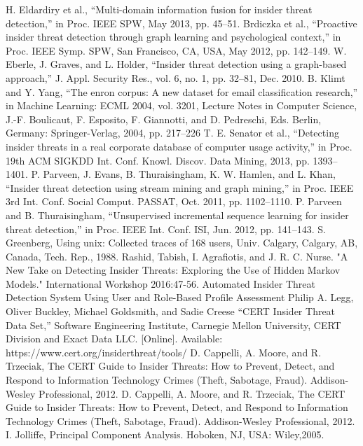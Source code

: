 \documentclass[conference]{IEEEtran}
\begin{document}
\begin{thebibliography}{00}
 H. Eldardiry et al., “Multi-domain information fusion for insider threat detection,” in Proc. IEEE SPW, May 2013, pp. 45–51.
 Brdiczka et al., “Proactive insider threat detection through graph learning and psychological context,” in Proc. IEEE Symp. SPW, San Francisco, CA, USA, May 2012, pp. 142–149.
W. Eberle, J. Graves, and L. Holder, “Insider threat detection using a graph-based approach,” J. Appl. Security Res., vol. 6, no. 1, pp. 32–81, Dec. 2010.
B. Klimt and Y. Yang, “The enron corpus: A new dataset for email classification research,” in Machine Learning: ECML 2004, vol. 3201, Lecture Notes in Computer Science, J.-F. Boulicaut, F. Esposito, F. Giannotti, and D. Pedreschi, Eds. Berlin, Germany: Springer-Verlag, 2004, pp. 217–226
T. E. Senator et al., “Detecting insider threats in a real corporate database of computer usage activity,” in Proc. 19th ACM SIGKDD Int. Conf. Knowl. Discov. Data Mining, 2013, pp. 1393–1401.
P. Parveen, J. Evans, B. Thuraisingham, K. W. Hamlen, and L. Khan, “Insider threat detection using stream mining and graph mining,” in Proc. IEEE 3rd Int. Conf. Social Comput. PASSAT, Oct. 2011, pp. 1102–1110.
P. Parveen and B. Thuraisingham, “Unsupervised incremental sequence learning for insider threat detection,” in Proc. IEEE Int. Conf. ISI, Jun. 2012, pp. 141–143.
S. Greenberg, Using unix: Collected traces of 168 users, Univ. Calgary, Calgary, AB, Canada, Tech. Rep., 1988.
 Rashid, Tabish, I. Agrafiotis, and J. R. C. Nurse. "A New Take on Detecting Insider Threats: Exploring the Use of Hidden Markov Models." International Workshop 2016:47-56.
Automated Insider Threat Detection System Using User and Role-Based Profile Assessment Philip A. Legg, Oliver Buckley, Michael Goldsmith, and Sadie Creese
“CERT Insider Threat Data Set,” Software Engineering Institute, Carnegie Mellon University, CERT Division and Exact
Data LLC. [Online]. Available: https://www.cert.org/insiderthreat/tools/
D. Cappelli, A. Moore, and R. Trzeciak, The CERT Guide to Insider Threats: How to Prevent, Detect, and Respond
to Information Technology Crimes (Theft, Sabotage, Fraud). Addison-Wesley Professional, 2012.
 D. Cappelli, A. Moore, and R. Trzeciak, The CERT Guide to Insider Threats: How to Prevent, Detect, and Respond
to Information Technology Crimes (Theft, Sabotage, Fraud). Addison-Wesley Professional, 2012.
I. Jolliffe, Principal Component Analysis. Hoboken, NJ, USA: Wiley,2005.

\end{thebibliography}
\end{document}
